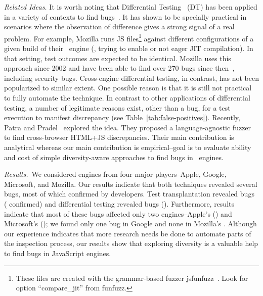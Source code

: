 \documentclass[10pt,conference,anonymous]{IEEEtran}
\begin{document}
\emph{Related Ideas.}  It is worth noting that Differential
Testing~\cite{Brumley-etal-ss07} (DT) has been applied in a variety of
contexts to find
bugs~\cite{Yang-etal-pldi11,Chen-etal-fse2015,Argyros-etla-ccs16,Chen-etal-pldi16,petsios-etal-sp2017,SivakornAPKJ17,Zhang:2017:ATD:3097368.3097448}.
It has shown to be specially practical in scenarios where the
observation of difference gives a strong signal of a real problem. For
example, Mozilla runs JS files\footnote{These files are created with
  the grammar-based fuzzer jsfunfuzz~\cite{jsfunfuzz}. Look for option
  ``compare\_jit'' from funfuzz.} against different configurations of
a given build of their \smonkey\ engine (\eg{}, trying to enable or
not eager JIT compilation). In that setting, test outcomes are
expected to be identical. Mozilla uses this approach since 2002 and
have been able to find over 270 bugs since
then~\cite{jsfunfuzz-at-mozilla}, including security
bugs. Cross-engine differential testing, in contrast, has not been
popularized to similar extent. One possible reason is that it is still
not practical to fully automate the technique. In contrast to other
applications of differential testing, a number of legitimate reasons
exist, other than a bug, for a test execution to manifest discrepancy
(see Table~\ref{tab:false-positives}). Recently, Patra and
Pradel~\cite{patra2016learning} explored the idea. They proposed a
language-agnostic fuzzer to find cross-browser HTML+JS
discrepancies. Their main contribution is analytical whereas our main
contribution is empirical--goal is to evaluate ability and cost of
simple diversity-aware approaches to find bugs in \js\ engines.

\emph{Results.}~We considered engines from four major players--Apple,
Google, Microsoft, and Mozilla. Our results indicate that both
techniques revealed several bugs, most of which confirmed by
developers. Test transplantation revealed \noBugsTransplantation{}
bugs (\noBugsTransplantationConfirmed{} confirmed) and differential
testing revealed \noBugsDifferentialTesting{} bugs
(\noBugsDifferentialTestingConfirmed{}). Furthermore, results indicate
that most of these bugs affected only two engines--Apple's \jsc{}
(\percJSC{}) and Microsoft's \chakra{} (\percChakra{}); we found only
one bug in Google \veight{} and none in Mozilla's \smonkey{}. Although
our experience indicates that more research needs be done to automate
parts of the inspection process, our results show that exploring
diversity is a valuable help to find bugs in JavaScript engines.
\end{document}
